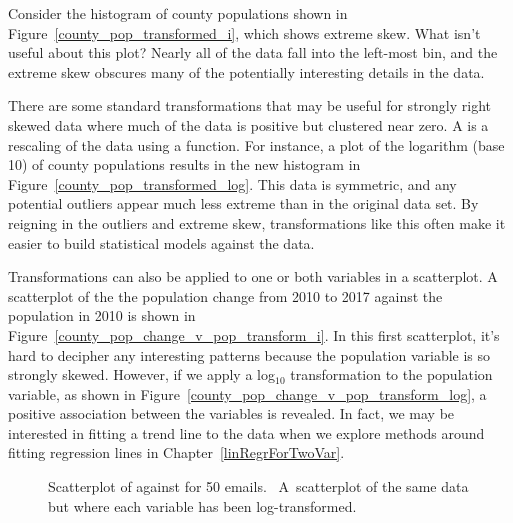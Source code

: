 \begin{example}{Consider the histogram of county populations
    shown in Figure~\ref{county_pop_transformed_i},
    which shows extreme skew.
    What isn't useful about this plot?}
  Nearly all of the data fall into the left-most bin,
  and the extreme skew obscures many of the potentially
  interesting details in the data.
\end{example}

There are some standard transformations that may be
useful for strongly right skewed data where much of the
data is positive but clustered near zero.
A  is a rescaling of the data
using a function.
For instance, a plot of the logarithm (base 10) of
county populations results in the new histogram in
Figure~\ref{county_pop_transformed_log}.
This data is symmetric, and any potential outliers
appear much less extreme than in the original data set.
By reigning in the outliers and extreme skew,
transformations like this often make it easier to build
statistical models against the data.

Transformations can also be applied to one or both
variables in a scatterplot.
A scatterplot of the the population change from 2010 to 2017
against the population in 2010 is shown in Figure~\ref{county_pop_change_v_pop_transform_i}.
In this first scatterplot, it's hard to decipher any
interesting patterns because the population variable
is so strongly skewed.
However, if we apply a log$_{10}$ transformation to
the population variable, as shown in
Figure~\ref{county_pop_change_v_pop_transform_log},
a positive association between the variables is revealed.
In fact, we may be interested in fitting a trend line to
the data when we explore methods around fitting regression
lines in Chapter~\ref{linRegrForTwoVar}.

\begin{figure}
  \centering
  \caption{
      Scatterplot of 
      against  for 50 emails.
      ~A~scatterplot
      of the same data but where each variable
      has been log-transformed.}
  \label{county_pop_change_v_pop_transform_main}
\end{figure}

